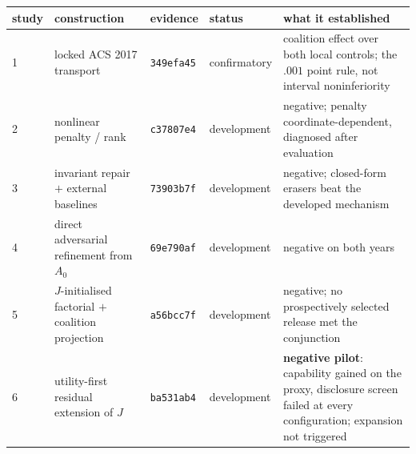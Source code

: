 \begin{tabular}{@{}l p{3.4cm} l l p{5.7cm}@{}}
\toprule
study & construction & evidence & status & what it established \\
\midrule
1 & locked ACS 2017 transport & \texttt{349efa45} & confirmatory & coalition effect over both local controls; the $.001$ point rule, not interval noninferiority \\
2 & nonlinear penalty / rank & \texttt{c37807e4} & development & negative; penalty coordinate-dependent, diagnosed after evaluation \\
3 & invariant repair $+$ external baselines & \texttt{73903b7f} & development & negative; closed-form erasers beat the developed mechanism \\
4 & direct adversarial refinement from $A_0$ & \texttt{69e790af} & development & negative on both years \\
5 & $J$-initialised factorial $+$ coalition projection & \texttt{a56bcc7f} & development & negative; no prospectively selected release met the conjunction \\
6 & utility-first residual extension of $J$ & \texttt{ba531ab4} & development & \textbf{negative pilot}: capability gained on the proxy, disclosure screen failed at every configuration; expansion not triggered \\
\bottomrule
\end{tabular}
